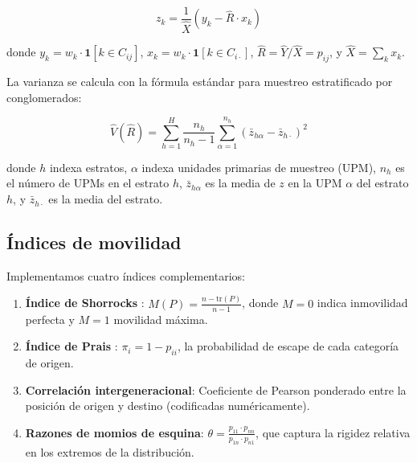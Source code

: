 \documentclass[12pt, a4paper]{article}
\begin{document}
\begin{equation}
    z_k = \frac{1}{\hat{X}} \left( y_k - \hat{R} \cdot x_k \right)
    \label{eq:taylor}
\end{equation}

donde $y_k = w_k \cdot \mathbf{1}[k \in C_{ij}]$, $x_k = w_k \cdot \mathbf{1}[k \in C_{i\cdot}]$, $\hat{R} = \hat{Y}/\hat{X} = p_{ij}$, y $\hat{X} = \sum_k x_k$.

La varianza se calcula con la fórmula estándar para muestreo estratificado por conglomerados:

\begin{equation}
    \hat{V}(\hat{R}) = \sum_{h=1}^{H} \frac{n_h}{n_h - 1} \sum_{\alpha=1}^{n_h} \left( \bar{z}_{h\alpha} - \bar{z}_{h\cdot} \right)^2
    \label{eq:variance}
\end{equation}

donde $h$ indexa estratos, $\alpha$ indexa unidades primarias de muestreo (UPM), $n_h$ es el número de UPMs en el estrato $h$, $\bar{z}_{h\alpha}$ es la media de $z$ en la UPM $\alpha$ del estrato $h$, y $\bar{z}_{h\cdot}$ es la media del estrato.

\subsection{Índices de movilidad}

Implementamos cuatro índices complementarios:

\begin{enumerate}
    \item \textbf{Índice de Shorrocks} \citep{shorrocks1978}: $M(P) = \frac{n - \text{tr}(P)}{n - 1}$, donde $M = 0$ indica inmovilidad perfecta y $M = 1$ movilidad máxima.

    \item \textbf{Índice de Prais} \citep{prais1955}: $\pi_i = 1 - p_{ii}$, la probabilidad de escape de cada categoría de origen.

    \item \textbf{Correlación intergeneracional}: Coeficiente de Pearson ponderado entre la posición de origen y destino (codificadas numéricamente).

    \item \textbf{Razones de momios de esquina}: $\theta = \frac{p_{11} \cdot p_{nn}}{p_{1n} \cdot p_{n1}}$, que captura la rigidez relativa en los extremos de la distribución.
\end{enumerate}


\end{document}

